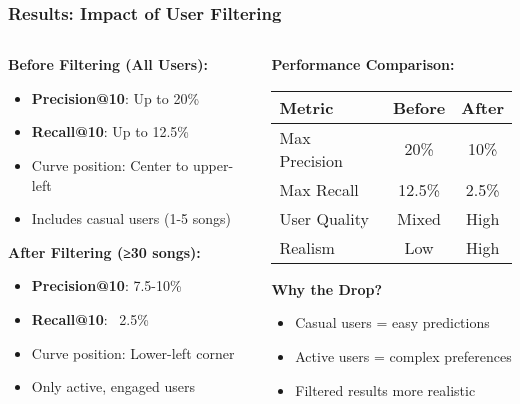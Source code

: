 \documentclass[11pt]{beamer}
\begin{document}
\begin{frame}
\frametitle{Results: Impact of User Filtering}
\begin{columns}
\begin{column}{0.5\textwidth}
\textbf{Before Filtering (All Users):}
\begin{itemize}
\item \textbf{Precision@10}: Up to 20\%
\item \textbf{Recall@10}: Up to 12.5\%
\item Curve position: Center to upper-left
\item Includes casual users (1-5 songs)
\end{itemize}

\vspace{0.3cm}
\textbf{After Filtering (≥30 songs):}
\begin{itemize}
\item \textbf{Precision@10}: 7.5-10\%
\item \textbf{Recall@10}: ~2.5\%
\item Curve position: Lower-left corner
\item Only active, engaged users
\end{itemize}
\end{column}
\begin{column}{0.5\textwidth}
\begin{center}
\textbf{Performance Comparison:}
\small
\begin{tabular}{|l|c|c|}
\hline
\textbf{Metric} & \textbf{Before} & \textbf{After} \\
\hline
Max Precision & 20\% & 10\% \\
Max Recall & 12.5\% & 2.5\% \\
User Quality & Mixed & High \\
Realism & Low & High \\
\hline
\end{tabular}

\vspace{0.3cm}
\textbf{Why the Drop?}
\begin{itemize}
\item Casual users = easy predictions
\item Active users = complex preferences
\item Filtered results more realistic
\end{itemize}
\end{center}
\end{column}
\end{columns}
\end{frame}
\end{document}
